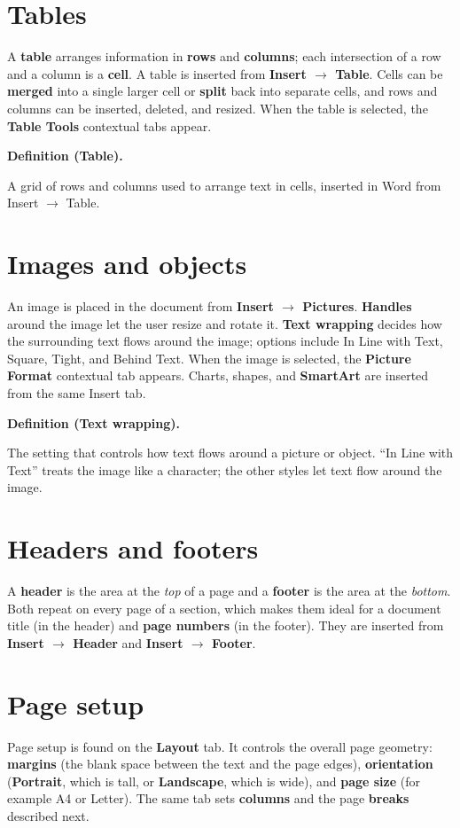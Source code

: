 \documentclass[11pt]{article}
\newenvironment{definitionbox}[1]{%
  \par\noindent\textbf{Definition (#1).}\ \itshape
}{\par\vspace{0.3em}}
\begin{document}
\section{Tables}
A \textbf{table} arranges information in \textbf{rows} and \textbf{columns};
each intersection of a row and a column is a \textbf{cell}. A table is
inserted from \textbf{Insert $\rightarrow$ Table}. Cells can be
\textbf{merged} into a single larger cell or \textbf{split} back into
separate cells, and rows and columns can be inserted, deleted, and resized.
When the table is selected, the \textbf{Table Tools} contextual tabs appear.

\begin{definitionbox}{Table}
A grid of rows and columns used to arrange text in cells, inserted in Word
from Insert $\rightarrow$ Table.
\end{definitionbox}

\section{Images and objects}
An image is placed in the document from \textbf{Insert $\rightarrow$
Pictures}. \textbf{Handles} around the image let the user resize and rotate
it. \textbf{Text wrapping} decides how the surrounding text flows around the
image; options include In Line with Text, Square, Tight, and Behind Text.
When the image is selected, the \textbf{Picture Format} contextual tab
appears. Charts, shapes, and \textbf{SmartArt} are inserted from the same
Insert tab.

\begin{definitionbox}{Text wrapping}
The setting that controls how text flows around a picture or object. ``In
Line with Text'' treats the image like a character; the other styles let
text flow around the image.
\end{definitionbox}

\section{Headers and footers}
A \textbf{header} is the area at the \emph{top} of a page and a
\textbf{footer} is the area at the \emph{bottom}. Both repeat on every page
of a section, which makes them ideal for a document title (in the header)
and \textbf{page numbers} (in the footer). They are inserted from
\textbf{Insert $\rightarrow$ Header} and \textbf{Insert $\rightarrow$
Footer}.

\section{Page setup}
Page setup is found on the \textbf{Layout} tab. It controls the overall page
geometry: \textbf{margins} (the blank space between the text and the page
edges), \textbf{orientation} (\textbf{Portrait}, which is tall, or
\textbf{Landscape}, which is wide), and \textbf{page size} (for example A4
or Letter). The same tab sets \textbf{columns} and the page \textbf{breaks}
described next.
\end{document}
